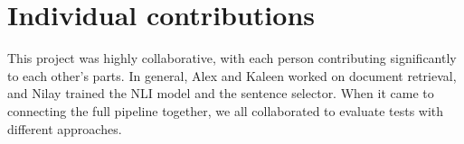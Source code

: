 \documentclass[11pt,a4paper]{article}
\begin{document}
\section{Individual contributions}

This project was highly collaborative, with each person contributing significantly to each other's parts. In general, Alex and Kaleen worked on document retrieval, and Nilay trained the NLI model and the sentence selector. When it came to connecting the full pipeline together, we all collaborated to evaluate tests with different approaches.



\end{document}
